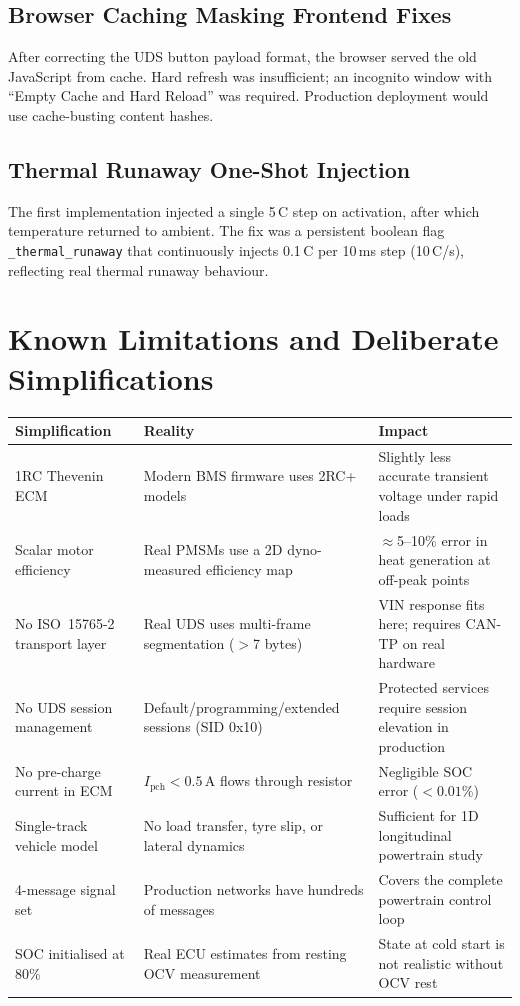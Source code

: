 \documentclass[12pt, a4paper, openany]{report}
\newcommand{\code}[1]{\texttt{#1}}
\begin{document}
\begin{center}
\subsection{Browser Caching Masking Frontend Fixes}
After correcting the UDS button payload format, the browser served the old
JavaScript from cache. Hard refresh was insufficient; an incognito window
with ``Empty Cache and Hard Reload'' was required. Production deployment
would use cache-busting content hashes.

\subsection{Thermal Runaway One-Shot Injection}
The first implementation injected a single 5\,\textdegree C step on
activation, after which temperature returned to ambient. The fix was a
persistent boolean flag \code{\_thermal\_runaway} that continuously injects
0.1\,\textdegree C per 10\,ms step (10\,\textdegree C/s), reflecting real
thermal runaway behaviour.

\section{Known Limitations and Deliberate Simplifications}

\begin{table}[!ht]
\centering\small
\begin{tabularx}{\textwidth}{lXX}
  \toprule
  \rowcolor{TblHead}
  \color{white}\textbf{Simplification} &
  \color{white}\textbf{Reality} &
  \color{white}\textbf{Impact} \\
  \midrule
  1RC Thevenin ECM
    & Modern BMS firmware uses 2RC+ models
    & Slightly less accurate transient voltage under rapid loads \\
  \rowcolor{TblAlt}
  Scalar motor efficiency
    & Real PMSMs use a 2D dyno-measured efficiency map
    & $\approx$5--10\% error in heat generation at off-peak points \\
  No ISO~15765-2 transport layer
    & Real UDS uses multi-frame segmentation ($>$7 bytes)
    & VIN response fits here; requires CAN-TP on real hardware \\
  \rowcolor{TblAlt}
  No UDS session management
    & Default/programming/extended sessions (SID 0x10)
    & Protected services require session elevation in production \\
  No pre-charge current in ECM
    & $I_\text{pch} < 0.5$\,A flows through resistor
    & Negligible SOC error ($<0.01\%$) \\
  \rowcolor{TblAlt}
  Single-track vehicle model
    & No load transfer, tyre slip, or lateral dynamics
    & Sufficient for 1D longitudinal powertrain study \\
  4-message signal set
    & Production networks have hundreds of messages
    & Covers the complete powertrain control loop \\
  \rowcolor{TblAlt}
  SOC initialised at 80\%
    & Real ECU estimates from resting OCV measurement
    & State at cold start is not realistic without OCV rest \\
  \bottomrule
\end{tabularx}
\end{table}


\end{center}
\end{document}
